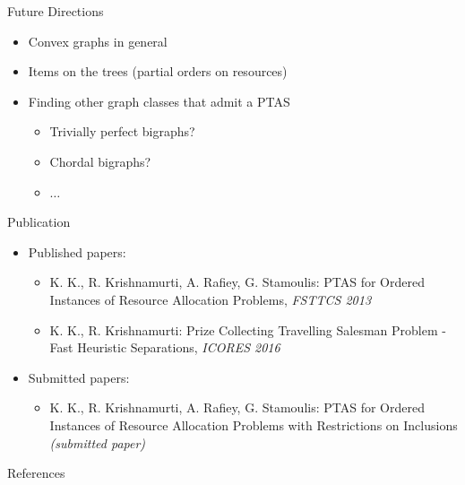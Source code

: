 \documentclass[10pt]{beamer}
\begin{document}
\begin{frame}{Future Directions}
	\begin{itemize}
    	\item<1-> Convex graphs in general
        \item<2-> Items on the trees (partial orders on resources)
        \item<3-> Finding other graph classes that admit a PTAS
        	\begin{itemize}
            	\item<4-> Trivially perfect bigraphs?
                \item<5-> Chordal bigraphs?
                \item<6-> $\ldots$
            \end{itemize}
    \end{itemize}
\end{frame}



\begin{frame}{Publication}
\begin{itemize}
    \item Published papers:
    \begin{itemize}
        \item[\cite{KKRS13}]  K. K., R. Krishnamurti, A. Rafiey, G. Stamoulis: \alert{PTAS for Ordered Instances of Resource Allocation Problems}, \emph{FSTTCS 2013}
        \item[\cite{KK16}] K. K., R. Krishnamurti: \alert{Prize Collecting Travelling Salesman Problem - Fast Heuristic Separations}, \emph{ICORES 2016} 
    \end{itemize}
    \item Submitted papers:
    \begin{itemize}
        \item[\cite{KKRS16}] K. K., R. Krishnamurti, A. Rafiey, G. Stamoulis:
\alert{PTAS for Ordered Instances of Resource Allocation Problems with Restrictions on Inclusions} \emph{(submitted paper)} 
    \end{itemize}
        
\end{itemize}

\end{frame}

\begin{frame}[allowframebreaks]{References}

	
    

\end{frame}
\end{document}
